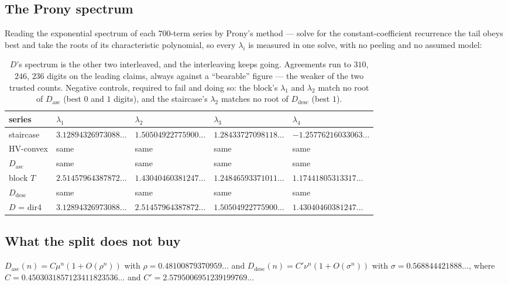 \documentclass[11pt]{article}
\begin{document}
\subsection{The Prony spectrum}

Reading the exponential spectrum of each $700$-term series by Prony's method ---
solve for the constant-coefficient recurrence the tail obeys best and take the
roots of its characteristic polynomial, so every $\lambda_i$ is measured in one
solve, with no peeling and no assumed model:

\begin{table}[H]
\centering\small
\begin{tabular}{l l l l l}
\toprule
series & $\lambda_1$ & $\lambda_2$ & $\lambda_3$ & $\lambda_4$ \\
\midrule
staircase & $3.12894326973088\dots$ & $1.50504922775900\dots$ & $1.28433727098118\dots$ & $-1.25776216033063\dots$ \\
HV-convex & same & same & same & same \\
$D_{\mathrm{asc}}$ & same & same & same & same \\
block $T$ & $2.51457964387872\dots$ & $1.43040460381247\dots$ & $1.24846593371011\dots$ & $1.17441805313317\dots$ \\
$D_{\mathrm{desc}}$ & same & same & same & same \\
$D$ = dir4 & $3.12894326973088\dots$ & $2.51457964387872\dots$ & $1.50504922775900\dots$ & $1.43040460381247\dots$ \\
\bottomrule
\end{tabular}
\caption{$D$'s spectrum is the other two interleaved, and the interleaving keeps
going. Agreements run to $310$, $246$, $236$ digits on the leading claims, always
against a ``bearable'' figure --- the weaker of the two trusted counts. Negative
controls, required to fail and doing so: the block's $\lambda_1$ and $\lambda_2$
match no root of $D_{\mathrm{asc}}$ (best $0$ and $1$ digits), and the
staircase's $\lambda_2$ matches no root of $D_{\mathrm{desc}}$ (best $1$).}
\label{tab:prony}
\end{table}

\subsection{What the split does not buy}

\begin{conjecture}
\label{conj:sharp}
$D_{\mathrm{asc}}(n) = C\mu^n(1 + O(\rho^n))$ with $\rho = 0.48100879370959\dots$
and $D_{\mathrm{desc}}(n) = C'\nu^n(1 + O(\sigma^n))$ with
$\sigma = 0.568844421888\dots$, where $C = 0.4503031857123411823536\dots$ and
$C' = 2.5795006951239199769\dots$
\end{conjecture}
\end{document}
